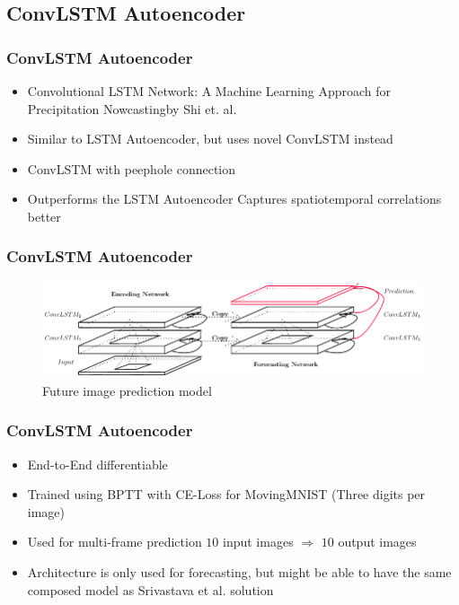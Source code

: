  \subsection{ConvLSTM Autoencoder}
  \begin{frame}
   \frametitle{ConvLSTM Autoencoder}
   
   \begin{itemize}
    \item<1-> \glqq Convolutional LSTM Network: A Machine Learning Approach for Precipitation Nowcasting\grqq by Shi et. al. \citep{Shi2015}
    \item<2-> Similar to LSTM Autoencoder, but uses novel ConvLSTM instead
    \item<3-> ConvLSTM with peephole connection    
    \item<4-> Outperforms the LSTM Autoencoder \glqq Captures spatiotemporal correlations better\grqq
   \end{itemize}
   
  \end{frame}
  \begin{frame}
   \frametitle{ConvLSTM Autoencoder}
   
   \begin{figure}[H]
    \includegraphics[width=1.0\textwidth]{../Images/shi.png}
    \centering
    \caption{Future image prediction model \citep{Shi2015}}
    \label{fig:convlstm_architecture}
   \end{figure}
   
  \end{frame}
  \begin{frame}
   \frametitle{ConvLSTM Autoencoder}
   
   \begin{itemize}
    \item<1-> End-to-End differentiable
	\item<2-> Trained using BPTT with CE-Loss for MovingMNIST (Three digits per image)
	\item<3-> Used for multi-frame prediction $10$ input images $\Rightarrow$ $10$ output images
	\item<4-> Architecture is only used for forecasting, but might be able to have the same composed model as Srivastava et al. solution
   \end{itemize}
  
  \end{frame}
